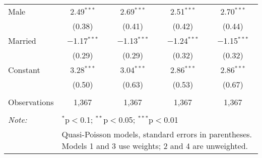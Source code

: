 \begin{table}[!htbp]
\begin{tabular}{@{\extracolsep{5pt}}lcccc}
  Male & 2.49$^{***}$ & 2.69$^{***}$ & 2.51$^{***}$ & 2.70$^{***}$ \\ 
  & (0.38) & (0.41) & (0.42) & (0.44) \\ 
  Married & $-$1.17$^{***}$ & $-$1.13$^{***}$ & $-$1.24$^{***}$ & $-$1.15$^{***}$ \\ 
  & (0.29) & (0.29) & (0.32) & (0.32) \\ 
  Constant & 3.28$^{***}$ & 3.04$^{***}$ & 2.86$^{***}$ & 2.86$^{***}$ \\ 
  & (0.50) & (0.63) & (0.53) & (0.67) \\ 
 \hline \\[-1.8ex] 
Observations & 1,367 & 1,367 & 1,367 & 1,367 \\ 
\hline 
\hline \\[-1.8ex] 
\textit{Note:}  & \multicolumn{4}{l}{$^{*}$p$<$0.1; $^{**}$p$<$0.05; $^{***}$p$<$0.01} \\ 
 & \multicolumn{4}{l}{Quasi-Poisson models, standard errors in parentheses. Models 1 and 3 use weights; 2 and 4 are unweighted.} \\ 
\end{tabular} 
\end{table} 
